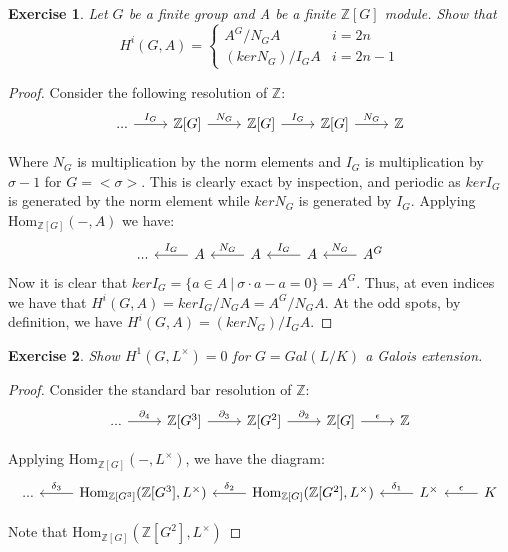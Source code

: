 \documentclass{article}
\newcommand{\Hom}{\text{Hom}}
\newcommand{\bb}[1]{\mathbb{#1}}
\newtheorem{exercise}{Exercise}
\begin{document}
\begin{exercise}
  Let $G$ be a finite group and A be a finite $\bb{Z}[G]$ module. Show that
  \[
    H^{i}(G, A) =
    \begin{cases}
      A^{G}/N_{G}A & i = 2n \\
      (ker N_{G})/I_{G}A & i = 2n-1
    \end{cases}
  \]
\end{exercise}
\begin{proof}
  Consider the following resolution of $\bb{Z}$:
  \[
    \begin{tikzcd}
... \arrow[r, "I_G"] & {\bb{Z}[G]} \arrow[r, "N_G"] & {\bb{Z}[G]} \arrow[r, "I_G"] & {\bb{Z}[G]} \arrow[r, "N_G"] & \bb{Z}
\end{tikzcd}
\]

Where $N_{G}$ is multiplication by the norm elements and $I_{G}$ is multiplication by $\sigma - 1$ for $G = < \sigma >$. This is clearly exact by inspection, and periodic as $kerI_{G}$ is generated by the norm element while $kerN_{G}$ is generated by $I_{G}$. Applying $\Hom_{\bb{Z}[G]}(-,A)$ we have:
\[
  \begin{tikzcd}
... & A \arrow[l, "I_G"'] & A \arrow[l, "N_G"'] & A \arrow[l, "I_G"'] & A^G \arrow[l, "N_G"']
\end{tikzcd}
\]
Now it is clear that $kerI_{G} = \{a \in A \ | \ \sigma \cdot a - a = 0 \} = A^{G}$. Thus, at even indices we have that $H^{i}(G, A) = kerI_{G}/N_{G}A = A^{G}/N_{G}A$. At the odd spots, by definition, we have $H^{i}(G,A) = (kerN_{G})/I_{G}A$.
\end{proof}

\begin{exercise}
  Show $H^{1}(G, L^{\times}) = 0$ for $G = Gal(L/K)$ a Galois extension.
\end{exercise}
\begin{proof}
  Consider the standard bar resolution of $\bb{Z}$:
  \[
    \begin{tikzcd}
... \arrow[r, "\partial_4"] & {\bb{Z}[G^3]} \arrow[r, "\partial_3"] & {\bb{Z}[G^2]} \arrow[r, "\partial_2"] & {\bb{Z}[G]} \arrow[r, "\epsilon"] & \bb{Z}
\end{tikzcd}
\]

Applying $\Hom_{\bb{Z}[G]}(-, L^{\times})$, we have the diagram:
\[
  \begin{tikzcd}
... & \Hom_{\bb{Z}[G^3]}(\bb{Z}[G^3], L^\times) \arrow[l, "\delta_3"'] & \Hom_{\bb{Z}[G]}(\bb{Z}[G^2], L^\times) \arrow[l, "\delta_2"'] & L^{\times} \arrow[l, "\delta_1"'] & K \arrow[l, "\epsilon"']
\end{tikzcd}
\]

Note that $\Hom_{\bb{Z}[G]}(\bb{Z}[G^2], L^\times)$ 
\end{proof}
\end{document}
